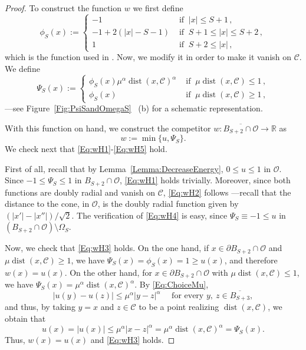 \documentclass[12pt,reqno]{amsart}
\theoremstyle{definition}
\theoremstyle{remark}
\newcommand{\con}[1]{\mathbb{#1}}
\newcommand{\R}{\con{R}} %
\newcommand{\ccal}{\mathscr{C}}
\newcommand{\ocal}{\mathcal{O}}
\DeclareMathOperator{\dist}{dist}
\numberwithin{equation}{section}
\begin{document}
\begin{proof}
	To construct the function $w$ we first define
	\begin{equation}
		\label{Eq:DefOfPhiS}
		\phi_S(x):= 
		\begin{cases}
		-1 & \textrm{ if }  \ |x| \leq S+1\,, \\
		-1 + 2 (|x| - S-1)&  \textrm{ if } \ S+1 \leq |x| \leq S+2\,, \\
		1 & \textrm{ if }  \  S+2 \leq |x|\,,
		\end{cases}
	\end{equation}
	which is the function used in \cite{SavinValdinoci-EnergyEstimate}. Now, we modify it in order to make it vanish on $\ccal$. We define
	$$
	\Psi_S(x) :=
	\begin{cases}
	\phi_S (x) \mu^\alpha \dist(x,\ccal)^\alpha &  \textrm{ if }  \  \mu\dist(x,\ccal) \leq 1 \,, \\
	\phi_S (x) & \textrm{ if }  \  \mu\dist(x,\ccal) \geq 1\,,
	\end{cases}
	$$
	---see Figure~\ref{Fig:PsiSandOmegaS}~ (b) for a schematic representation.
	
	With this function on hand, we construct the competitor  $w:\overline{B_{S+2} \cap \ocal} \to \R$ as
	$$
	w:= \min \{u, \Psi_S\}.
	$$
	We check next that \eqref{Eq:wH1}-\eqref{Eq:wH5} hold.
	
	First of all, recall that by Lemma~\ref{Lemma:DecreaseEnergy}, $0\leq u \leq 1$ in $\ocal$. Since $-1\leq \Psi_S\leq 1$ in $B_{S+2} \cap \ocal$, \eqref{Eq:wH1} holds trivially. Moreover, since both functions are doubly radial and vanish on $\ccal$, \eqref{Eq:wH2} follows ---recall that the distance to the cone, in $\ocal$, is the doubly radial function given by $(|x'|-|x''|)/\sqrt{2}$. The verification of \eqref{Eq:wH4} is easy, since $\Psi_S \equiv-1 \leq u$ in $(B_{S+2}\cap \ocal)\setminus \Omega_S$.
	
	Now, we check that \eqref{Eq:wH3} holds. On the one hand, if $x\in \partial B_{S+2}\cap \ocal$ and $\mu\dist(x,\ccal) \geq 1$, we have $\Psi_S (x) = \phi_S(x) = 1 \geq u(x)$, and therefore $w(x) = u(x)$. On the other hand, for $x\in \partial B_{S+2}\cap \ocal$ with $\mu\dist(x,\ccal) \leq 1$, we have $\Psi_S (x) = \mu^\alpha \dist (x,\ccal)^\alpha$. By \eqref{Eq:ChoiceMu},
	$$ 
	|u(y) - u(z)|\leq \mu^\alpha |y-z|^\alpha \quad \text{ for every } y, \ z \in \overline{B_{S+3}},
	$$ 
	and thus, by taking $y=x$ and $z\in \ccal$ to be a point realizing $\dist(x,\ccal)$, we obtain that
	$$ 
	u(x) = |u(x)|\leq \mu^\alpha |x-z|^\alpha  = \mu^\alpha \dist (x,\ccal)^\alpha = \Psi_S (x).
	$$ 
	Thus, $w(x) = u(x)$ and \eqref{Eq:wH3} holds.
	

\end{proof}
\end{document}
